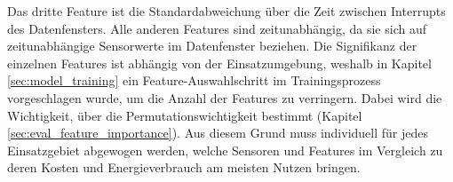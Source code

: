\newpage
Das dritte Feature ist die Standardabweichung über die Zeit zwischen Interrupts des Datenfensters.
Alle anderen Features sind zeitunabhängig, da sie sich auf zeitunabhängige Sensorwerte im Datenfenster beziehen.
\newline
\newline
Die Signifikanz der einzelnen Features ist abhängig von der Einsatzumgebung, weshalb in Kapitel \ref{sec:model_training}
ein Feature-Auswahlschritt im Trainingsprozess vorgeschlagen wurde, um die Anzahl der Features zu verringern.
Dabei wird die Wichtigkeit, über die Permutationswichtigkeit bestimmt (Kapitel \ref{sec:eval_feature_importance}).
Aus diesem Grund muss individuell für jedes Einsatzgebiet abgewogen werden, welche Sensoren und Features im Vergleich zu deren Kosten und Energieverbrauch am meisten Nutzen bringen.
